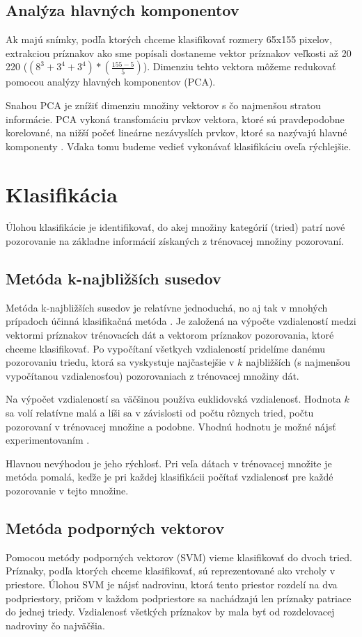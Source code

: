 \subsection{Analýza hlavných komponentov}
Ak majú snímky, podľa ktorých chceme klasifikovať rozmery 65x155 pixelov, extrakciou príznakov ako sme popísali dostaneme vektor príznakov veľkosti až 20 220 ($(8^3 + 3^4 + 3^4)*(\frac{155-5}{5})$).
Dimenziu tehto vektora môžeme redukovať pomocou analýzy hlavných komponentov (PCA).

Snahou PCA je znížiť dimenziu množiny vektorov s čo najmenšou stratou informácie.
PCA vykoná transfomáciu prvkov vektora, ktoré sú pravdepodobne korelované, na nižší počeť lineárne nezávyslích prvkov, ktoré sa nazývajú hlavné komponenty \cite{pca}.
Vďaka tomu budeme vedieť vykonávať klasifikáciu oveľa rýchlejšie.

\section{Klasifikácia}
Úlohou klasifikácie je identifikovať, do akej množiny kategórií (tried) patrí nové pozorovanie na základne informácií získaných z trénovacej množiny pozorovaní.
\subsection{Metóda k-najbližších susedov}
Metóda k-najbližších susedov je relatívne jednoduchá, no aj tak v mnohých prípadoch účinná klasifikačná metóda \cite{knn}.
Je založená na výpočte vzdialeností medzi vektormi príznakov trénovacích dát a vektorom príznakov pozorovania, ktoré chceme klasifikovať.
Po vypočítaní všetkych vzdialeností pridelíme danému pozorovaniu triedu, ktorá sa vyskystuje najčastejšie v $k$ najbližších (s najmenšou vypočítanou vzdialenosťou) pozorovaniach z trénovacej množiny dát.

Na výpočet vzdialeností sa väčšinou používa euklidovská vzdialenosť.
Hodnota $k$ sa volí relatívne malá a líši sa v závislosti od počtu rôznych tried, počtu pozorovaní v trénovacej množine a podobne. 
Vhodnú hodnotu je možné nájsť experimentovaním \cite{knn}.

Hlavnou nevýhodou je jeho rýchlosť. 
Pri veľa dátach v trénovacej množite je metóda pomalá, keďže je pri každej klasifikácii počítať vzdialenosť pre každé pozorovanie v tejto množine.

\subsection{Metóda podporných vektorov}
Pomocou metódy podporných vektorov (SVM) vieme klasifikovať do dvoch tried.
Príznaky, podľa ktorých chceme klasifikovať, sú reprezentované ako vrcholy v priestore.
Úlohou SVM je nájsť nadrovinu, ktorá tento priestor rozdelí na dva podpriestory, pričom v každom podpriestore sa nachádzajú len príznaky patriace do jednej triedy.
Vzdialenosť všetkých príznakov by mala byť od rozdelovacej nadroviny čo najväčšia.

